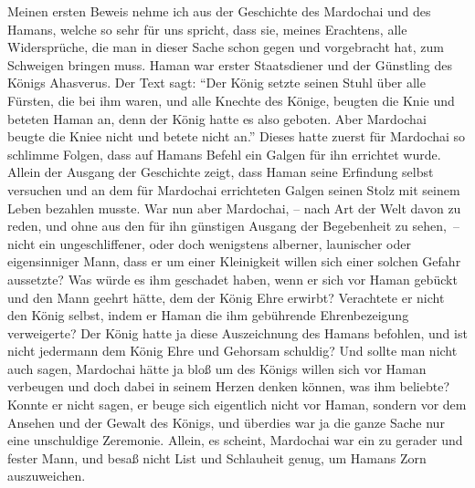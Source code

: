 Meinen ersten Beweis nehme ich aus der Geschichte des
Mardochai und des Hamans,
welche so sehr für uns spricht, dass sie, meines Erachtens, alle Widersprüche,
die man in dieser Sache schon gegen und vorgebracht hat, zum Schweigen bringen
muss. Haman war erster Staatsdiener und der Günstling des Königs Ahasverus. Der
Text sagt:
"`Der König setzte seinen Stuhl über alle Fürsten, die bei ihm waren,
und alle Knechte des Könige, beugten die Knie und beteten Haman an, denn der
König hatte es also geboten. Aber Mardochai beugte die Kniee nicht und betete
nicht an."'
Dieses hatte zuerst für Mardochai so
schlimme Folgen, dass auf Hamans Befehl ein Galgen für ihn errichtet wurde.
Allein
der Ausgang der Geschichte zeigt, dass Haman seine Erfindung selbst versuchen
und an dem für Mardochai errichteten Galgen seinen Stolz mit seinem Leben
bezahlen musste. War nun aber Mardochai, -- nach Art der Welt davon zu reden,
und
ohne aus den für ihn günstigen Ausgang der Begebenheit zu sehen,~-- nicht ein
ungeschliffener, oder doch wenigstens alberner, launischer oder eigensinniger
Mann, dass er um einer Kleinigkeit willen sich einer solchen Gefahr aussetzte?
Was würde es ihm geschadet haben, wenn er sich vor
Haman gebückt und den Mann geehrt hätte, dem der König Ehre erwirbt? Verachtete
er nicht den König selbst, indem er Haman die ihm gebührende Ehrenbezeigung
verweigerte? Der König hatte ja diese Auszeichnung des Hamans befohlen, und ist
nicht jedermann dem König Ehre und Gehorsam schuldig? Und sollte man nicht auch
sagen, Mardochai hätte ja bloß um des Königs willen sich vor Haman verbeugen und
doch dabei in seinem Herzen denken können, was ihm beliebte? Konnte er nicht
sagen, er beuge sich eigentlich nicht vor Haman, sondern vor dem Ansehen und der
Gewalt des Königs, und überdies war ja die ganze Sache nur eine unschuldige
Zeremonie. Allein, es scheint, Mardochai war ein zu gerader und fester Mann, und
besaß nicht List und Schlauheit genug, um Hamans Zorn auszuweichen.

